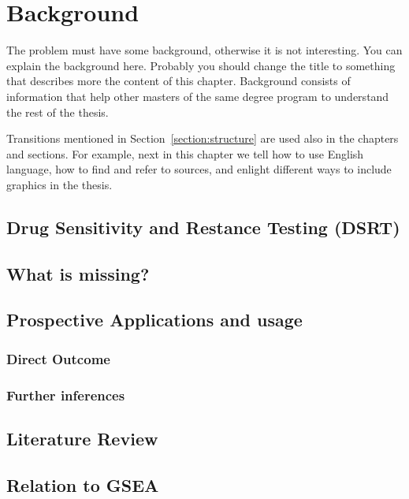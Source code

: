 \chapter{Background}
\label{chapter:background} 

The problem must have some background, otherwise it is not
interesting.  You can explain the background here. Probably you should
change the title to something that describes more the content of this
chapter. Background consists of information that help other masters of
the same degree program to understand the rest of the thesis.

Transitions mentioned in Section~\ref{section:structure} are used also
in the chapters and sections. For example, next in this chapter we
tell how to use English language, how to find and refer to sources,
and enlight different ways to include graphics in the thesis.

\section{Drug Sensitivity and Restance Testing (DSRT)}

\section{What is missing?}

\section{Prospective Applications and usage}
\subsection{Direct Outcome}
\subsection{Further inferences}

\section{Literature Review}
\section{Relation to GSEA}
